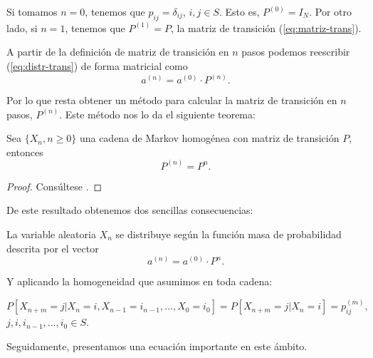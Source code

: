\begin{observacion}
    Si tomamos $n=0$, tenemos que $p_{ij}=\delta_{ij}$, $i,j\in S$. Esto es, $P^{(0)}=I_N$. Por otro lado, si $n=1$, tenemos que $P^{(1)}=P$, la matriz de transición (\ref{eq:matriz-trans}).
\end{observacion}

A partir de la definición de matriz de transición en $n$ pasos podemos reescribir (\ref{eq:distr-trans}) de forma matricial como
$$
a^{(n)}= a^{(0)} \cdot P^{(n)}.
$$

Por lo que resta obtener un método para calcular la matriz de transición en $n$ pasos, $P^{(n)}$. Este método nos lo da el siguiente teorema:

\begin{teorema}
    \label{th:matriz-trans-n}
    Sea $\{X_n,n\geq 0\}$ una cadena de Markov homogénea con matriz de transición $P$, entonces
    \begin{equation}
        \label{eq:matriz-trans-n-teorema}
        P^{(n)} = P^n.
    \end{equation}    
\end{teorema}
\begin{proof}
    Consúltese \cite[Ch. II, theorem 2.2]{kulkarni-2012}.
\end{proof}

De este resultado obtenemos dos sencillas consecuencias:

\begin{corolario}
    \label{cor:fmp}
    La variable aleatoria $X_n$ se distribuye según la función masa de probabilidad descrita por el vector 
    $$
    a^{(n)} = a^{(0)}\cdot P^n.
    $$
\end{corolario}

Y aplicando la homogeneidad que asumimos en toda cadena:

\begin{corolario}
    \label{cor:Pnm}
    $$
    P[X_{n+m}=j|X_n=i,X_{n-1}=i_{n-1},\dots,X_0=i_0] = P[X_{n+m}=j|X_n=i]=p_{ij}^{(m)},
    $$
$j,i,i_{n-1},\dots,i_0\in S$.
\end{corolario}

Seguidamente, presentamos una ecuación importante en este ámbito.


